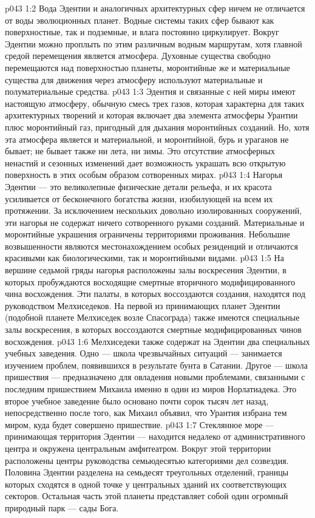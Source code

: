 \vs p043 1:2 Вода Эдентии и аналогичных архитектурных сфер ничем не отличается от воды эволюционных планет. Водные системы таких сфер бывают как поверхностные, так и подземные, и влага постоянно циркулирует. Вокруг Эдентии можно проплыть по этим различным водным маршрутам, хотя главной средой перемещения является атмосфера. Духовные существа свободно перемещаются над поверхностью планеты, моронтийные же и материальные существа для движения через атмосферу используют материальные и полуматериальные средства.
\vs p043 1:3 Эдентия и связанные с ней миры имеют настоящую атмосферу, обычную смесь трех газов, которая характерна для таких архитектурных творений и которая включает два элемента атмосферы Урантии плюс моронтийный газ, пригодный для дыхания моронтийных созданий. Но, хотя эта атмосфера является и материальной, и моронтийной, бурь и ураганов не бывает; не бывает также ни лета, ни зимы. Это отсутствие атмосферных ненастий и сезонных изменений дает возможность украшать всю открытую поверхность в этих особым образом сотворенных мирах.
\vs p043 1:4 Нагорья Эдентии --- это великолепные физические детали рельефа, и их красота усиливается от бесконечного богатства жизни, изобилующей на всем их протяжении. За исключением нескольких довольно изолированных сооружений, эти нагорья не содержат ничего сотворенного руками созданий. Материальные и моронтийные украшения ограничены территориями проживания. Небольшие возвышенности являются местонахождением особых резиденций и отличаются красивыми как биологическими, так и моронтийными видами.
\vs p043 1:5 \pc На вершине седьмой гряды нагорья расположены залы воскресения Эдентии, в которых пробуждаются восходящие смертные вторичного модифицированного чина восхождения. Эти палаты, в которых воссоздаются создания, находятся под руководством Мелхиседеков. На первой из принимающих планет Эдентии (подобной планете Мелхиседек возле Спасограда) также имеются специальные залы воскресения, в которых воссоздаются смертные модифицированных чинов восхождения.
\vs p043 1:6 Мелхиседеки также содержат на Эдентии два специальных учебных заведения. Одно --- школа чрезвычайных ситуаций --- занимается изучением проблем, появившихся в результате бунта в Сатании. Другое --- школа пришествия --- предназначено для овладения новыми проблемами, связанными с последним пришествием Михаила именно в один из миров Норлатиадека. Это второе учебное заведение было основано почти сорок тысяч лет назад, непосредственно после того, как Михаил объявил, что Урантия избрана тем миром, куда будет совершено пришествие.
\vs p043 1:7 \pc Стеклянное море --- принимающая территория Эдентии --- находится недалеко от административного центра и окружена центральным амфитеатром. Вокруг этой территории расположены центры руководства семьюдесятью категориями дел созвездия. Половина Эдентии разделена на семьдесят треугольных отделений, границы которых сходятся в одной точке у центральных зданий их соответствующих секторов. Остальная часть этой планеты представляет собой один огромный природный парк --- сады Бога.
